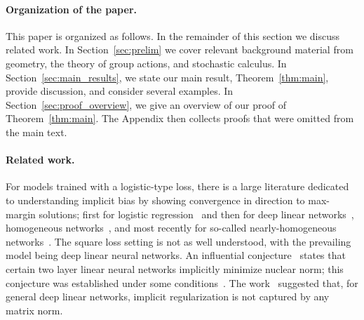 \documentclass[twoside,a4paper,11pt]{article}
\theoremstyle{plain}
\begin{document}
 































\paragraph*{Organization of the paper.}
This paper is organized as follows. In the remainder
of this section we discuss related work.
In Section~\ref{sec:prelim}
we cover relevant background material
from geometry, the theory of group actions, and stochastic calculus.
In Section~\ref{sec:main_results}, we state our main result,
Theorem~\ref{thm:main}, provide discussion, and consider
several examples.
In Section~\ref{sec:proof_overview},
we give an overview of our proof of Theorem~\ref{thm:main}.
The Appendix then collects proofs that were omitted
from the main text.


\paragraph*{Related work.}
For models trained with a logistic-type loss,
there is a large literature dedicated
to understanding implicit bias by showing
convergence in direction
to max-margin solutions;
first for logistic regression~\cite{soudry2018implicit} and then for deep linear networks~\cite{ji2018gradient}, homogeneous
networks~\cite{lyu2019gradient},
and most recently for so-called nearly-homogeneous networks~\cite{cai2025implicit}.
The square loss setting is not as well understood,
with the prevailing model being deep linear neural networks.
An influential conjecture~\cite{gunasekar2017implicit}
states that certain two layer linear neural networks implicitly 
minimize nuclear norm;
this conjecture was established
under some conditions~\cite{li2018algorithmic}.
The work~\cite{arora2019implicit}
suggested that, for general deep linear networks, implicit regularization is not
captured by any matrix norm.
\end{document}
